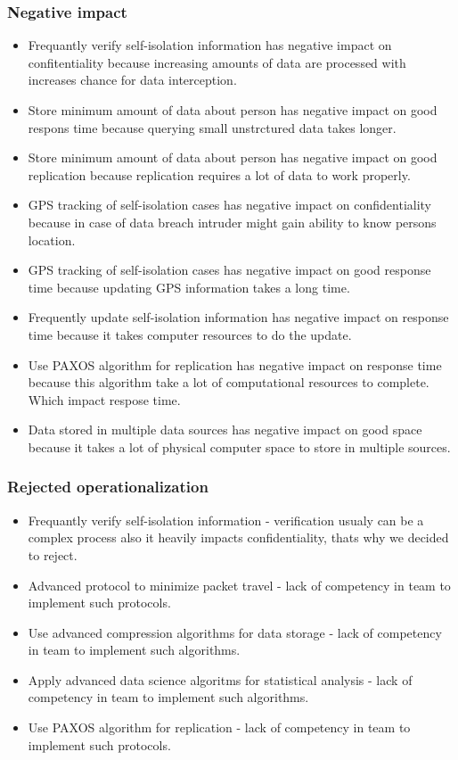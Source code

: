 \documentclass{VUMIFPSkursinis}
\begin{document}
	\subsubsection{Negative impact}
		\begin{itemize}
			\item{Frequantly verify self-isolation information has negative impact on confitentiality because increasing amounts of data are processed with increases chance for data interception.}
			\item{Store minimum amount of data about person has negative impact on good respons time because querying small unstrctured data takes longer.}
			\item{Store minimum amount of data about person has negative impact on good replication because replication requires a lot of data to work properly.}
			\item{GPS tracking of self-isolation cases has negative impact on confidentiality because in case of data breach intruder might gain ability to know persons location.}
			\item{GPS tracking of self-isolation cases has negative impact on good response time because updating GPS information takes a long time.}
			\item{Frequently update self-isolation information has negative impact on response time because it takes computer resources to do the update.}
			\item{Use PAXOS algorithm for replication has negative impact on response time because this algorithm take a lot of computational resources to complete. Which impact respose time.}
			\item{Data stored in multiple data sources has negative impact on good space because it takes a lot of physical computer space to store in multiple sources.}
		\end{itemize}
	\subsubsection{Rejected operationalization}
		\begin{itemize}
			\item{Frequantly verify self-isolation information - verification usualy can be a complex process also it heavily impacts confidentiality, thats why we decided to reject.}
			\item{Advanced protocol to minimize packet travel - lack of competency in team to implement such protocols.}
			\item{Use advanced compression algorithms for data storage - lack of competency in team to implement such algorithms.}
			\item{Apply advanced data science algoritms for statistical analysis - lack of competency in team to implement such algorithms.}
			\item{Use PAXOS algorithm for replication - lack of competency in team to implement such protocols.}
		\end{itemize}
\end{document}
